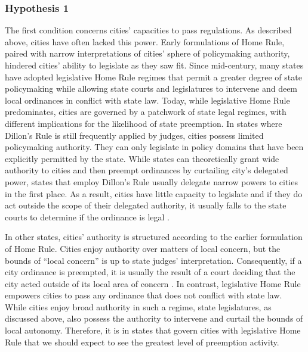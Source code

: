 \documentclass[12pt]{article}
\begin{document}
\subsubsection*{Hypothesis 1}
The first condition concerns cities' capacities to pass regulations. As described above, cities have often lacked this power. Early formulations of Home Rule, paired with narrow interpretations of cities' sphere of policymaking authority, hindered cities' ability to legislate as they saw fit. Since mid-century, many states have adopted legislative Home Rule regimes that permit a greater degree of state policymaking while allowing state courts and legislatures to intervene and deem local ordinances in conflict with state law. Today, while legislative Home Rule predominates, cities are governed by a patchwork of state legal regimes, with different implications for the likelihood of state preemption. In states where Dillon's Rule is still frequently applied by judges, cities possess limited policymaking authority. They can only legislate in policy domains that have been explicitly permitted by the state. While states can theoretically grant wide authority to cities and then preempt ordinances by curtailing city's delegated power, states that employ Dillon's Rule usually delegate narrow powers to cities in the first place. As a result, cities have little capacity to legislate and if they do act outside the scope of their delegated authority, it usually falls to the state courts to determine if the ordinance is legal \parencite{dillerIntrastatePreemption2007}.

In other states, cities' authority is structured according to the earlier formulation of Home Rule. Cities enjoy authority over matters of local concern, but the bounds of ``local concern'' is up to state judges' interpretation. Consequently, if a city ordinance is preempted, it is usually the result of a court deciding that the city acted outside of its local area of concern \parencite{dillerIntrastatePreemption2007}. In contrast, legislative Home Rule empowers cities to pass any ordinance that does not conflict with state law. While cities enjoy broad authority in such a regime, state legislatures, as discussed above, also possess the authority to intervene and curtail the bounds of local autonomy. Therefore, it is in states that govern cities with legislative Home Rule that we should expect to see the greatest level of preemption activity. 
\end{document}

